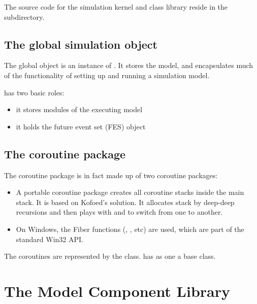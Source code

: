 The source code for the simulation kernel
and class library reside in the  subdirectory.


\subsection{The global simulation object}

The global  object is an instance of .
It stores the model, and encapsulates much of the functionality
of setting up and running a simulation model.

 has two basic roles:

\begin{itemize}
  \item{it stores modules of the executing model}
  \item{it holds the future event set (FES) object}
\end{itemize}



\subsection{The coroutine package}

The coroutine package is in fact made up of two coroutine
packages:

\begin{itemize}
  \item A portable coroutine package creates all coroutine stacks
     inside the main stack. It is based on Kofoed's solution\cite{Kofoed95}.
     It allocates stack by deep-deep recursions and then plays with
      and  to switch from one to another.

  \item On Windows, the Fiber functions (,
     , etc) are used, which are part of
     the standard Win32 API.
\end{itemize}

The coroutines are represented by the 
class.  has  as one a
base class.



\section{The Model Component Library}

